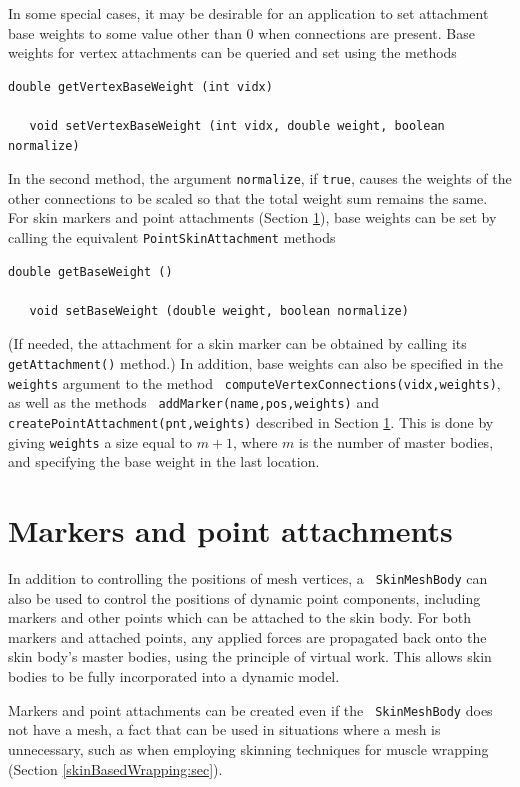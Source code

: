 In some special cases, it may be desirable for an application to set
attachment base weights to some value other than 0 when connections
are present. Base weights for vertex attachments can be queried
and set using the methods
%
\begin{lstlisting}[]
   double getVertexBaseWeight (int vidx)

   void setVertexBaseWeight (int vidx, double weight, boolean normalize)
\end{lstlisting}
%
In the second method, the argument {\tt normalize}, if {\tt true},
causes the weights of the other connections to be scaled so that the
total weight sum remains the same. For skin markers and point attachments
(Section \ref{markersAndAttachments:sec}), base weights can be set
by calling the equivalent {\tt PointSkinAttachment} methods
%
\begin{lstlisting}[]
   double getBaseWeight ()

   void setBaseWeight (double weight, boolean normalize)
\end{lstlisting}
%
(If needed, the attachment for a skin marker can be obtained by
calling its {\tt getAttachment()} method.) In addition, base weights
can also be specified in the {\tt weights} argument to the method {\tt
computeVertexConnections(vidx,weights)}, as well as the methods {\tt
addMarker(name,pos,weights)} and {\tt
createPointAttachment(pnt,weights)} described in Section
\ref{markersAndAttachments:sec}. This is done by giving {\tt weights}
a size equal to $m+1$, where $m$ is the number of master bodies, and
specifying the base weight in the last location.

\section{Markers and point attachments}
\label{markersAndAttachments:sec}

In addition to controlling the positions of mesh vertices, a {\tt
SkinMeshBody} can also be used to control the positions of dynamic
point components, including markers and other points which can be
attached to the skin body. For both markers and attached points, any
applied forces are propagated back onto the skin body's master bodies,
using the principle of virtual work.  This allows skin bodies to be
fully incorporated into a dynamic model.

Markers and point attachments can be created even if the {\tt
SkinMeshBody} does not have a mesh, a fact that can be used in
situations where a mesh is unnecessary, such as when employing skinning
techniques for muscle wrapping (Section \ref{skinBasedWrapping:sec}).

